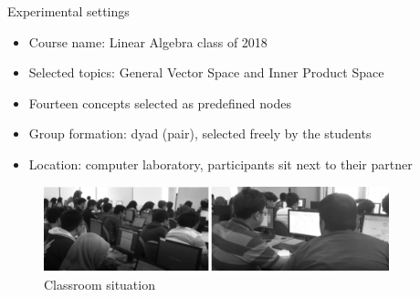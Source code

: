 \begin{frame}{Experimental settings}
\begin{itemize}
    \item Course name: Linear Algebra class of 2018
    \item Selected topics: General Vector Space and Inner Product Space
    \item Fourteen concepts selected as predefined nodes
    \item Group formation: dyad (pair), selected freely by the students
    \item Location: computer laboratory, participants sit next to their partner
\end{itemize}

\begin{figure}[tb]
    \begin{center}
            \includegraphics[width=100mm]{images/classroom_situation.pdf}
        \end{center}
        \caption{Classroom situation}
        \label{intro::classroom}
    \end{figure}

\end{frame}


